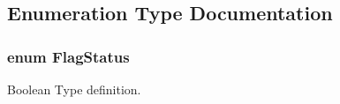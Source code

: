 \subsection{Enumeration Type Documentation}
\subsubsection[{\texorpdfstring{Flag\+Status}{FlagStatus}}]{\setlength{\rightskip}{0pt plus 5cm}enum {\bf Flag\+Status}}\hypertarget{group___l_p_c___types___public___types_ga89136caac2e14c55151f527ac02daaff}{}\label{group___l_p_c___types___public___types_ga89136caac2e14c55151f527ac02daaff}


Boolean Type definition. 

